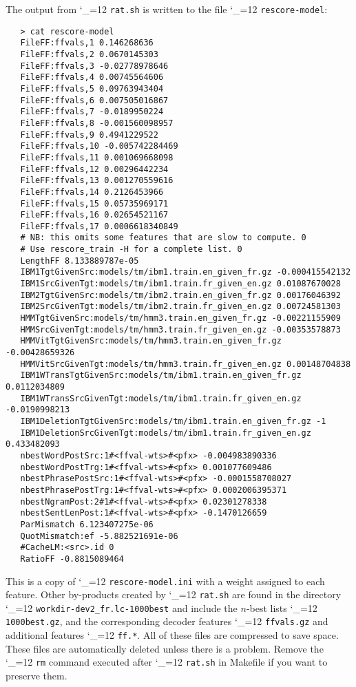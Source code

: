 \documentclass[11pt,letterpaper]{article}
\def\code{\begingroup\catcode`\_=12 \codex}
\newcommand{\codex}[1]{\texttt{#1}\endgroup}
\begin{document}
The output from \code{rat.sh} is written to the file \code{rescore-model}:
\begin{small}
\begin{verbatim}
   > cat rescore-model
   FileFF:ffvals,1 0.146268636
   FileFF:ffvals,2 0.0670145303
   FileFF:ffvals,3 -0.02778978646
   FileFF:ffvals,4 0.00745564606
   FileFF:ffvals,5 0.09763943404
   FileFF:ffvals,6 0.007505016867
   FileFF:ffvals,7 -0.0189950224
   FileFF:ffvals,8 -0.001560098957
   FileFF:ffvals,9 0.4941229522
   FileFF:ffvals,10 -0.005742284469
   FileFF:ffvals,11 0.001069668098
   FileFF:ffvals,12 0.00296442234
   FileFF:ffvals,13 0.001270559616
   FileFF:ffvals,14 0.2126453966
   FileFF:ffvals,15 0.05735969171
   FileFF:ffvals,16 0.02654521167
   FileFF:ffvals,17 0.0006618340849
   # NB: this omits some features that are slow to compute. 0
   # Use rescore_train -H for a complete list. 0
   LengthFF 8.133889787e-05
   IBM1TgtGivenSrc:models/tm/ibm1.train.en_given_fr.gz -0.000415542132
   IBM1SrcGivenTgt:models/tm/ibm1.train.fr_given_en.gz 0.01087670028
   IBM2TgtGivenSrc:models/tm/ibm2.train.en_given_fr.gz 0.00176046392
   IBM2SrcGivenTgt:models/tm/ibm2.train.fr_given_en.gz 0.00724581303
   HMMTgtGivenSrc:models/tm/hmm3.train.en_given_fr.gz -0.00221155909
   HMMSrcGivenTgt:models/tm/hmm3.train.fr_given_en.gz -0.00353578873
   HMMVitTgtGivenSrc:models/tm/hmm3.train.en_given_fr.gz -0.00428659326
   HMMVitSrcGivenTgt:models/tm/hmm3.train.fr_given_en.gz 0.00148704838
   IBM1WTransTgtGivenSrc:models/tm/ibm1.train.en_given_fr.gz 0.0112034809
   IBM1WTransSrcGivenTgt:models/tm/ibm1.train.fr_given_en.gz -0.0190998213
   IBM1DeletionTgtGivenSrc:models/tm/ibm1.train.en_given_fr.gz -1
   IBM1DeletionSrcGivenTgt:models/tm/ibm1.train.fr_given_en.gz 0.433482093
   nbestWordPostSrc:1#<ffval-wts>#<pfx> -0.004983890336
   nbestWordPostTrg:1#<ffval-wts>#<pfx> 0.001077609486
   nbestPhrasePostSrc:1#<ffval-wts>#<pfx> -0.0001558708027
   nbestPhrasePostTrg:1#<ffval-wts>#<pfx> 0.0002006395371
   nbestNgramPost:2#1#<ffval-wts>#<pfx> 0.02301278338
   nbestSentLenPost:1#<ffval-wts>#<pfx> -0.1470126659
   ParMismatch 6.123407275e-06
   QuotMismatch:ef -5.882521691e-06
   #CacheLM:<src>.id 0
   RatioFF -0.8815089464
\end{verbatim}
\end{small}
This is a copy of \code{rescore-model.ini} with a weight assigned to each
feature. Other by-products created by \code{rat.sh} are found in the directory
\code{workdir-dev2_fr.lc-1000best} and include the $n$-best lists
\code{1000best.gz}, and the corresponding decoder features \code{ffvals.gz}
and additional features \code{ff.*}. All of these files are compressed to
save space. These files are automatically deleted unless there is a problem.
Remove the \code{rm} command executed after \code{rat.sh} in Makefile if
you want to preserve them.
\end{document}
